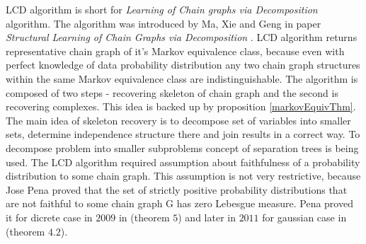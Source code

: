 %
%

LCD algorithm is short for \textit{Learning of Chain graphs via Decomposition} algorithm. The algorithm was introduced by Ma, Xie and Geng in paper 
\textit{Structural Learning of Chain Graphs via Decomposition} \cite{CG}. LCD algorithm returns 
representative chain graph of it's Markov equivalence class, because even with perfect knowledge of data probability
distribution any two chain graph structures within the same Markov equivalence class are indistinguishable. 
The algorithm is composed of two steps - recovering skeleton of chain graph and the second is recovering complexes. This
idea is backed up by proposition \ref{markovEquivThm}. 
The main idea of skeleton recovery is to decompose set of variables into smaller sets, determine independence structure there and join results in a correct way. 
To decompose problem into smaller subproblems concept of separation trees is being used.
The LCD algorithm required assumption about faithfulness of a probability distribution to some chain graph. This assumption is not very restrictive, because Jose Pena proved that the
set of strictly positive probability distributions that are not faithful to some chain graph G has zero Lebesgue measure. Pena proved it for dicrete case in $2009$ in \cite{FaithDicr}
(theorem $5$) and later in $2011$ for gaussian case in \cite{FaithGauss} (theorem $4.2$).


